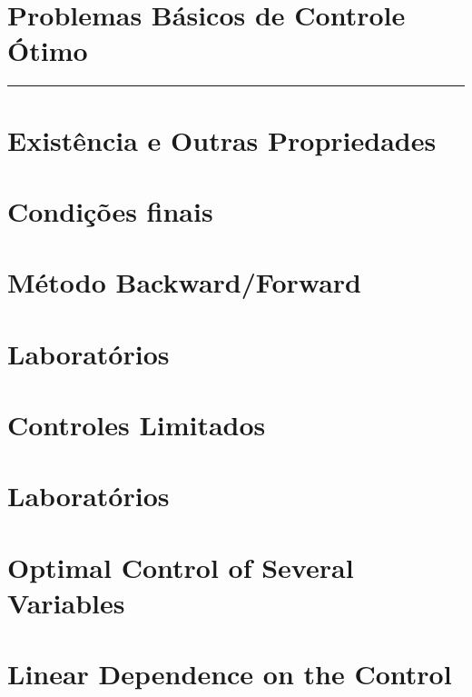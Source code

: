 \documentclass[a4paper, 11pt, oneside]{book}
\theoremstyle{definition}
\begin{document}


\tableofcontents

\chapter{Problemas Básicos de Controle Ótimo}
\label{ch:1}
\rule{\textwidth}{1pt}


\chapter{Existência e Outras Propriedades}


\chapter{Condições finais}


\chapter{Método Backward/Forward}


\chapter{Laboratórios}


\chapter{Controles Limitados}


\chapter{Laboratórios}


\chapter{Optimal Control of Several Variables}


\chapter{Linear Dependence on the Control}




\end{document}
